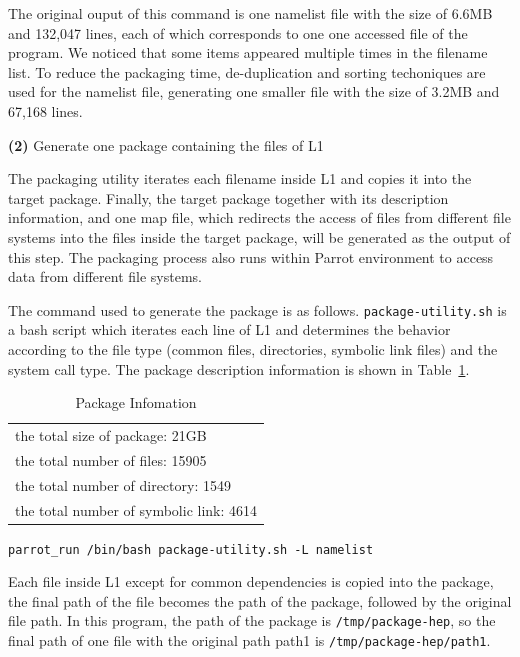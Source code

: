 \documentclass{acm_proc_article-sp}
\begin{document}
The original ouput of this command is one namelist file with the size of 6.6MB
and 132,047 lines, each of which corresponds to one one accessed file of the
program. We noticed that some items appeared multiple times in the filename list. To reduce the
packaging time, de-duplication and sorting techoniques are used for the
namelist file, generating one smaller file with the size of 3.2MB and 67,168 lines.

{\bf (2)} Generate one package containing the files of L1 

The packaging utility iterates each filename inside L1 and copies it into the
target package. Finally, the target package
together with its description information, and one map file, which redirects
the access of files from different file systems into the files inside the target package, will be
generated as the output of this step. The packaging process also runs within Parrot environment to
access data from different file systems.

The command used to generate the package is as follows. 
{\tt package-utility.sh} is a bash script which iterates each line of L1 and
determines the behavior according to the file type (common files, directories,
symbolic link files) and the system call type.
The package description information is shown in Table~\ref{table:package-info}.

\begin{table}
    \centering
    \begin{tabular}{|l|}
    \hline
     the total size of package: 21GB \\ 
    the total number of files: 15905\\ 
    the total number of directory: 1549\\ 
    the total number of symbolic link: 4614 \\ \hline 
    \end{tabular}
    \caption{Package Infomation}
    \label{table:package-info}
\end{table}

{\tt parrot\_run /bin/bash package-utility.sh -L namelist}

Each file inside L1 except for common dependencies is copied into the package, the final path of the file
becomes the path of the package, followed by the original file path. In this
program, the path of the package is {\tt /tmp/package-hep}, so the final path of one
file with the original path path1 is {\tt /tmp/package-hep/path1}.
\end{document}
